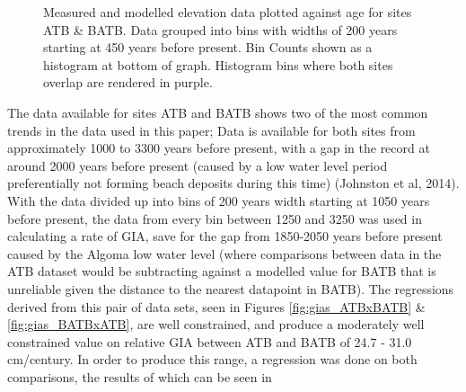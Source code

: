 \begin{figure}[H]
	\caption{Measured and modelled elevation data plotted against age for sites ATB \& BATB. Data grouped into bins with widths of 200 years starting at 450 years before present. Bin Counts shown as a histogram at bottom of graph. Histogram bins where both sites overlap are rendered in purple.}
	\label{fig:data_ATBxBATB}
\end{figure}
The data available for sites ATB and BATB shows two of the most common trends in
 the data used in this paper; Data is available for both sites from
 approximately 1000 to 3300 years before present,
 with a gap in the record at around 2000 years before present (caused by a low
 water level period preferentially not forming beach deposits during this time)
 (Johnston et al, 2014). With the data divided up into bins of 200 years width
 starting at 1050 years before present, the data from every bin between 1250 and 3250 was used
 in calculating a rate of GIA, save for the gap from 1850-2050 years before
 present caused by the Algoma low water level (where comparisons between data in the ATB dataset would be
 subtracting against a modelled value for BATB that is unreliable given
 the distance to the nearest datapoint in BATB). The regressions derived from this pair of data sets,
 seen in Figures \ref{fig:gias_ATBxBATB} \& \ref{fig:gias_BATBxATB}, are well
 constrained, and produce a moderately well constrained value on relative GIA
 between ATB and BATB of 24.7 - 31.0 cm/century. In order to produce this range, a
 regression was done on both comparisons, the results of which can be seen in
